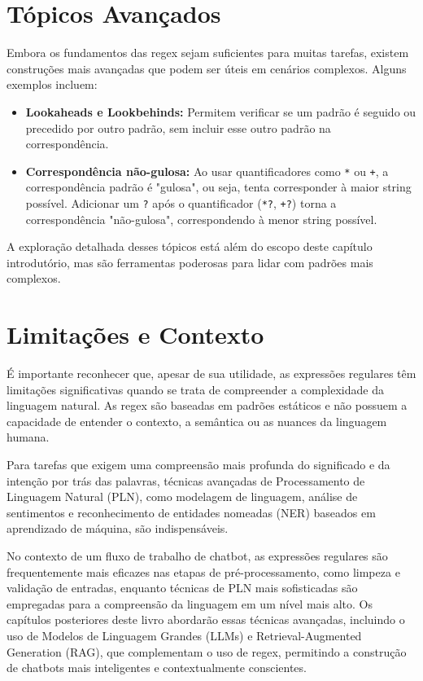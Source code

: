 \documentclass[14pt,a4paper,oneside]{book}
\begin{document}
\section{Tópicos Avançados}
Embora os fundamentos das regex sejam suficientes para muitas tarefas, existem construções mais avançadas que podem ser úteis em cenários complexos. Alguns exemplos incluem:
\begin{itemize}
    \item \textbf{Lookaheads e Lookbehinds:} Permitem verificar se um padrão é seguido ou precedido por outro padrão, sem incluir esse outro padrão na correspondência.
    \item \textbf{Correspondência não-gulosa:} Ao usar quantificadores como \texttt{*} ou \texttt{+}, a correspondência padrão é "gulosa", ou seja, tenta corresponder à maior string possível. Adicionar um \texttt{?} após o quantificador (\texttt{*?}, \texttt{+?}) torna a correspondência "não-gulosa", correspondendo à menor string possível.
\end{itemize}
A exploração detalhada desses tópicos está além do escopo deste capítulo introdutório, mas são ferramentas poderosas para lidar com padrões mais complexos.

\section{Limitações e Contexto}
É importante reconhecer que, apesar de sua utilidade, as expressões regulares têm limitações significativas quando se trata de compreender a complexidade da linguagem natural. As regex são baseadas em padrões estáticos e não possuem a capacidade de entender o contexto, a semântica ou as nuances da linguagem humana.

Para tarefas que exigem uma compreensão mais profunda do significado e da intenção por trás das palavras, técnicas avançadas de Processamento de Linguagem Natural (PLN), como modelagem de linguagem, análise de sentimentos e reconhecimento de entidades nomeadas (NER) baseados em aprendizado de máquina, são indispensáveis.

No contexto de um fluxo de trabalho de chatbot, as expressões regulares são frequentemente mais eficazes nas etapas de pré-processamento, como limpeza e validação de entradas, enquanto técnicas de PLN mais sofisticadas são empregadas para a compreensão da linguagem em um nível mais alto. Os capítulos posteriores deste livro abordarão essas técnicas avançadas, incluindo o uso de Modelos de Linguagem Grandes (LLMs) e Retrieval-Augmented Generation (RAG), que complementam o uso de regex, permitindo a construção de chatbots mais inteligentes e contextualmente conscientes.
\end{document}
